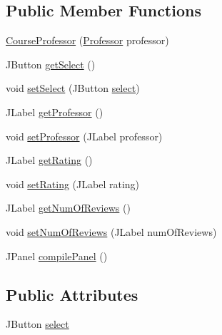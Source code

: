 \subsection*{Public Member Functions}
\begin{DoxyCompactItemize}
\item 
\mbox{\hyperlink{classcom_1_1_b_n_u_1_1pages_1_1teachers_by_class_1_1_course_professor_a3f352c35c91b1c64fbc5b7c9e02a6f1b}{Course\+Professor}} (\mbox{\hyperlink{classcom_1_1_b_n_u_1_1pages_1_1teachers_by_class_1_1_professor}{Professor}} professor)
\item 
J\+Button \mbox{\hyperlink{classcom_1_1_b_n_u_1_1pages_1_1teachers_by_class_1_1_course_professor_abfa426b98704375413766071924114c0}{get\+Select}} ()
\item 
void \mbox{\hyperlink{classcom_1_1_b_n_u_1_1pages_1_1teachers_by_class_1_1_course_professor_a473f6e5114bc60dce23f2ceaca11b948}{set\+Select}} (J\+Button \mbox{\hyperlink{classcom_1_1_b_n_u_1_1pages_1_1teachers_by_class_1_1_course_professor_a04debad4d0f70dd7ddbe956aa2c5347d}{select}})
\item 
J\+Label \mbox{\hyperlink{classcom_1_1_b_n_u_1_1pages_1_1teachers_by_class_1_1_course_professor_a799beb0e0e67445034786af62068ab99}{get\+Professor}} ()
\item 
void \mbox{\hyperlink{classcom_1_1_b_n_u_1_1pages_1_1teachers_by_class_1_1_course_professor_a6e736557da7229c0851f440572c364b2}{set\+Professor}} (J\+Label professor)
\item 
J\+Label \mbox{\hyperlink{classcom_1_1_b_n_u_1_1pages_1_1teachers_by_class_1_1_course_professor_ae6b49f741a8639fdd98db2ad17d3662e}{get\+Rating}} ()
\item 
void \mbox{\hyperlink{classcom_1_1_b_n_u_1_1pages_1_1teachers_by_class_1_1_course_professor_ad9e76991f9f0142bfc946939fc9372f0}{set\+Rating}} (J\+Label rating)
\item 
J\+Label \mbox{\hyperlink{classcom_1_1_b_n_u_1_1pages_1_1teachers_by_class_1_1_course_professor_a38848dc7ac227c5f3b07bb039dc09cf9}{get\+Num\+Of\+Reviews}} ()
\item 
void \mbox{\hyperlink{classcom_1_1_b_n_u_1_1pages_1_1teachers_by_class_1_1_course_professor_ad4f78f602eb8fc83d0c76a73c0a877f5}{set\+Num\+Of\+Reviews}} (J\+Label num\+Of\+Reviews)
\item 
J\+Panel \mbox{\hyperlink{classcom_1_1_b_n_u_1_1pages_1_1teachers_by_class_1_1_course_professor_a4807521835167bc7e58fabc604f1c4a9}{compile\+Panel}} ()
\end{DoxyCompactItemize}
\subsection*{Public Attributes}
\begin{DoxyCompactItemize}
\item 
J\+Button \mbox{\hyperlink{classcom_1_1_b_n_u_1_1pages_1_1teachers_by_class_1_1_course_professor_a04debad4d0f70dd7ddbe956aa2c5347d}{select}}
\end{DoxyCompactItemize}


